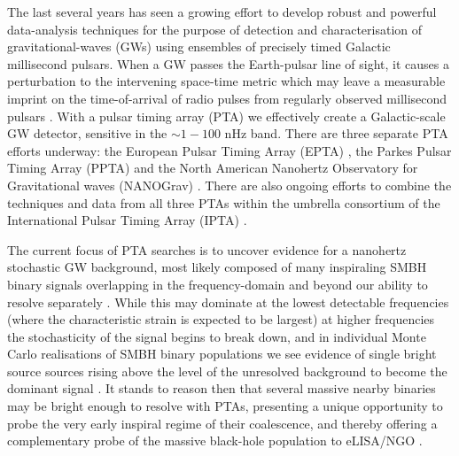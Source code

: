 \documentclass[twocolappendix,tighten]{emulateapj}
\begin{document}
The last several years has seen a growing effort to develop robust and powerful data-analysis techniques for the purpose of detection and characterisation of gravitational-waves (GWs) using ensembles of precisely timed Galactic millisecond pulsars. When a GW passes the Earth-pulsar line of sight, it causes a perturbation to the intervening space-time metric which may leave a measurable imprint on the time-of-arrival of radio pulses from regularly observed millisecond pulsars \citep{burke-1975,sazhin-1978,detweiler-1979,estabrook-1975}. With a pulsar timing array (PTA) \citep{foster-backer-1990} we effectively create a Galactic-scale GW detector, sensitive in the $\sim 1-100$ nHz band. %
There are three separate PTA efforts underway: the European Pulsar Timing Array (EPTA) \citep{eptareview2013}, the Parkes Pulsar Timing Array (PPTA) \citep{parkesreview2013} and the North American Nanohertz Observatory for Gravitational waves (NANOGrav) \citep{nanogravreview2013}. There are also ongoing efforts to combine the techniques and data from all three PTAs within the umbrella consortium of the International Pulsar Timing Array (IPTA) \citep{iptareview2013}.

The current focus of PTA searches is to uncover evidence for a nanohertz stochastic GW background, most likely composed of many inspiraling SMBH binary signals overlapping in the frequency-domain and beyond our ability to resolve separately \citep{rajaromani1995,jaffe-backer-2003,wyithe-loeb-2003}. While this may dominate at the lowest detectable frequencies (where the characteristic strain is expected to be largest) at higher frequencies the stochasticity of the signal begins to break down, and in individual Monte Carlo realisations of SMBH binary populations we see evidence of single bright source sources rising above the level of the unresolved background to become the dominant signal \citep{sesana-vecchio-colacino-2008,sesana-vecchio-volonteri-2009,ravi-2012}. It stands to reason then that several massive nearby binaries may be bright enough to resolve with PTAs, presenting a unique opportunity to probe the very early inspiral regime of their coalescence, and thereby offering a complementary probe of the massive black-hole population to eLISA/NGO \citep[e.g.,][]{sesana-review-2013-1,wenjenet2011}. 
\end{document}
